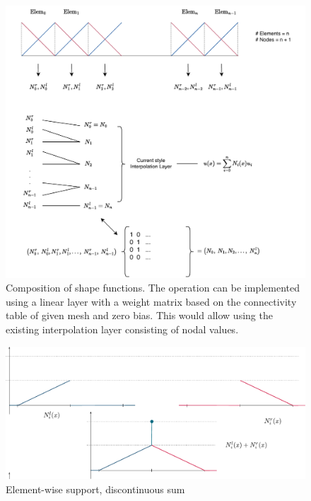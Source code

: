 \begin{figure}[bpt]
    \centering
    \includegraphics[width = 0.8\linewidth]{Schema/Diagram_NN_elementwise.drawio.pdf}
    \caption{Composition of shape functions.  The operation can be implemented using a linear layer with a weight matrix based on the connectivity table of given mesh and zero bias. This would allow using the existing interpolation layer consisting of nodal values.}
    \label{fig:assembly}
\end{figure}



\begin{figure}[htbpt]
    \centering
    \includegraphics[width=\linewidth]{Schema/Discontinuous_sum.pdf}
    \caption{Element-wise support, discontinuous sum}
    \label{fig:Discontinuous}
\end{figure}

